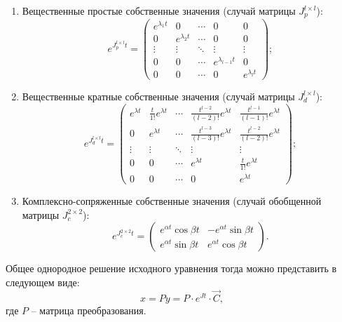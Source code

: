 	\begin{enumerate}
		\item Вещественные простые собственные значения (случай матрицы $J^{l \times l}_p$):
		\[ e^{J^{l \times l}_p t} = \begin{pmatrix} 
			e^{\lambda_1 t} & 0 & \cdots & 0 & 0 \\ 
			0 & e^{\lambda_2 t} & \cdots & 0 & 0 \\ 
			\vdots & \vdots & \ddots & \vdots & \vdots \\ 
			0 & 0 & \cdots & e^{\lambda_{l-1} t} & 0 \\ 
			0 & 0 & \cdots & 0 & e^{\lambda_l t} 
		\end{pmatrix}; \]
		\item Вещественные кратные собственные значения (случай матрицы $J^{l \times l}_d$):
		\[ e^{J^{l \times l}_d t} = \begin{pmatrix} 
			e^{\lambda t} & \frac{t}{1!} e^{\lambda t} & \cdots & \frac{t^{l-2}}{(l-2)!} e^{\lambda t} & \frac{t^{l-1}}{(l-1)!} e^{\lambda t} \\ 
			0 & e^{\lambda t} & \cdots & \frac{t^{l-3}}{(l-3)!} e^{\lambda t} & \frac{t^{l-2}}{(l-2)!} e^{\lambda t} \\ 
			\vdots & \vdots & \ddots & \vdots & \vdots \\ 
			0 & 0 & \cdots & e^{\lambda t} & \frac{t}{1!} e^{\lambda t} \\ 
			0 & 0 & \cdots & 0 & e^{\lambda t} 
		\end{pmatrix}; \]
		\item Комплексно-сопряженные собственные значения (случай обобщенной матрицы $J^{2 \times 2}_c$):
		\[ e^{J^{2 \times 2}_c t} = \begin{pmatrix} 
			e^{\alpha t} \cos{\beta t} & -e^{\alpha t} \sin{\beta t} \\ 
			e^{\alpha t} \sin{\beta t} & e^{\alpha t} \cos{\beta t}
		\end{pmatrix}. \]
	\end{enumerate}

	Общее однородное решение исходного уравнения тогда можно представить в следующем виде:
	\[ x = Py = P \cdot e^{Jt} \cdot \vec{C}, \]
	где $P$ -- матрица преобразования.

